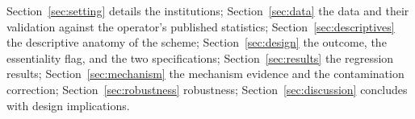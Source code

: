 Section~\ref{sec:setting} details the institutions; Section~\ref{sec:data}
the data and their validation against the operator's published statistics;
Section~\ref{sec:descriptives} the descriptive anatomy of the scheme;
Section~\ref{sec:design} the outcome, the essentiality flag, and the two
specifications; Section~\ref{sec:results} the regression results;
Section~\ref{sec:mechanism} the mechanism evidence and the contamination
correction; Section~\ref{sec:robustness} robustness;
Section~\ref{sec:discussion} concludes with design implications.

